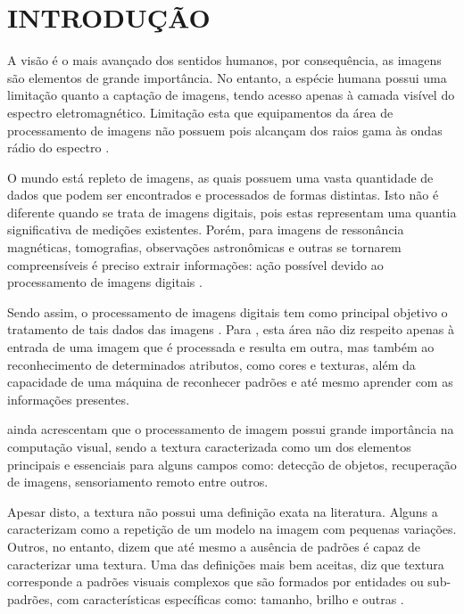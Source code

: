 
\chapter{INTRODUÇÃO}
\label{chap:introducao}

\par A visão é o mais avançado dos sentidos humanos, por consequência, as imagens são elementos de grande importância. No entanto, a espécie humana possui uma limitação quanto a captação de imagens, tendo acesso apenas à camada visível do espectro eletromagnético. Limitação esta que equipamentos da área de processamento de imagens não possuem pois alcançam dos raios gama às ondas rádio do espectro \cite{valencca2011monitorizaccao}.

\par O mundo está repleto de imagens, as quais possuem uma vasta quantidade de dados que podem ser encontrados e processados de formas distintas. Isto não é diferente quando se trata de imagens digitais, pois estas representam uma quantia significativa de medições existentes. Porém, para imagens de ressonância magnéticas, tomografias, observações astronômicas e outras se tornarem compreensíveis é preciso extrair informações: ação possível devido ao processamento de imagens digitais \cite{ScikitImage}.

\par Sendo assim, o processamento de imagens digitais tem como principal objetivo o tratamento de tais dados das imagens \cite{ScikitImage}. Para , esta área não diz respeito apenas à entrada de uma imagem que é processada e resulta em outra, mas também ao reconhecimento de determinados atributos, como cores e texturas, além da capacidade de uma máquina de reconhecer padrões e até mesmo aprender com as informações presentes.

\par {} ainda acrescentam que o processamento de imagem possui grande importância na computação visual, sendo a textura caracterizada como um dos elementos principais e essenciais para alguns campos como: detecção de objetos, recuperação de imagens, sensoriamento remoto entre outros. 

\par Apesar disto, a textura não possui uma definição exata na literatura. Alguns a caracterizam como a repetição de um modelo na imagem com pequenas variações. Outros, no entanto, dizem que até mesmo a ausência de padrões é capaz de caracterizar uma textura. Uma das definições mais bem aceitas, diz que textura corresponde a padrões visuais complexos que são formados por entidades ou sub-padrões, com características específicas como: tamanho, brilho e outras \cite{jarbas-color-texture}. 

